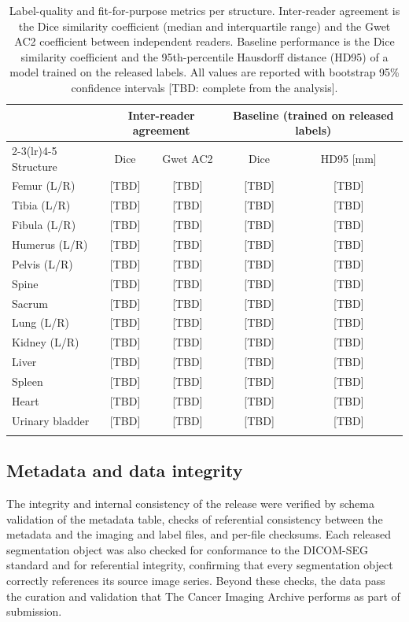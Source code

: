\begin{table}[h]
\caption{Label-quality and fit-for-purpose metrics per structure. Inter-reader agreement is the Dice similarity coefficient (median and interquartile range) and the Gwet AC2 coefficient between independent readers. Baseline performance is the Dice similarity coefficient and the 95th-percentile Hausdorff distance (HD95) of a model trained on the released labels. All values are reported with bootstrap 95\% confidence intervals [TBD: complete from the analysis].}\label{tab:metrics}
\begin{tabular}{@{}lcccc@{}}
\toprule
 & \multicolumn{2}{c}{Inter-reader agreement} & \multicolumn{2}{c}{Baseline (trained on released labels)} \\
\cmidrule(lr){2-3}\cmidrule(lr){4-5}
Structure & Dice & Gwet AC2 & Dice & HD95 [mm] \\
\midrule
Femur (L/R)           & [TBD] & [TBD] & [TBD] & [TBD] \\
Tibia (L/R)           & [TBD] & [TBD] & [TBD] & [TBD] \\
Fibula (L/R)          & [TBD] & [TBD] & [TBD] & [TBD] \\
Humerus (L/R)         & [TBD] & [TBD] & [TBD] & [TBD] \\
Pelvis (L/R)          & [TBD] & [TBD] & [TBD] & [TBD] \\
Spine                 & [TBD] & [TBD] & [TBD] & [TBD] \\
Sacrum                & [TBD] & [TBD] & [TBD] & [TBD] \\
Lung (L/R)            & [TBD] & [TBD] & [TBD] & [TBD] \\
Kidney (L/R)          & [TBD] & [TBD] & [TBD] & [TBD] \\
Liver                 & [TBD] & [TBD] & [TBD] & [TBD] \\
Spleen                & [TBD] & [TBD] & [TBD] & [TBD] \\
Heart                 & [TBD] & [TBD] & [TBD] & [TBD] \\
Urinary bladder       & [TBD] & [TBD] & [TBD] & [TBD] \\
\botrule
\end{tabular}
\end{table}

\subsection*{Metadata and data integrity}\label{subsec:integrity}
The integrity and internal consistency of the release were verified by schema validation of the metadata table, checks of referential consistency between the metadata and the imaging and label files, and per-file checksums.
Each released segmentation object was also checked for conformance to the DICOM-SEG standard and for referential integrity, confirming that every segmentation object correctly references its source image series.
Beyond these checks, the data pass the curation and validation that The Cancer Imaging Archive performs as part of submission.

